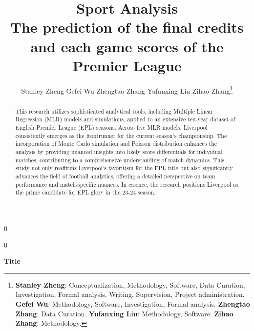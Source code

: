 \documentclass[12pt]{article}
\newcommand{\blind}{0}
\begin{document}

%

\def\spacingset#1{\renewcommand{\baselinestretch}%
{#1}\small\normalsize} \spacingset{1}




\blind
{
  \title{\bf{Sport Analysis} \\ \small{The prediction of the final credits and each game scores of the Premier League} }
  \author{Stanley Zheng \quad Gefei Wu \quad Zhengtao Zhang \quad Yufanxing Liu \quad Zihao Zhang\footnote{\textbf{Stanley Zheng}: Conceptualization, Methodology, Software, Data Curation, Investigation, Formal analysis, Writing, Supervision, Project administration. \textbf{Gefei Wu}: Methodology, Software, Investigation, Formal analysis. \textbf{Zhengtao Zhang}: Data Curation. \textbf{Yufanxing Liu}: Methodology, Software. \textbf{Zihao Zhang}: Methodology.}}
  \maketitle
} \fi

\blind
{
  \bigskip
  \bigskip
  \bigskip
  \begin{center}
    {\LARGE\bf Title}
\end{center}
  \medskip
} \fi

\bigskip
\begin{abstract}
This research utilizes sophisticated analytical tools, including Multiple Linear Regression (MLR) models and simulations, applied to an extensive ten-year dataset of English Premier League (EPL) seasons. Across five MLR models, Liverpool consistently emerges as the frontrunner for the current season's championship. The incorporation of Monte Carlo simulation and Poisson distribution enhances the analysis by providing nuanced insights into likely score differentials for individual matches, contributing to a comprehensive understanding of match dynamics. This study not only reaffirms Liverpool's favoritism for the EPL title but also significantly advances the field of football analytics, offering a detailed perspective on team performance and match-specific nuances. In essence, the research positions Liverpool as the prime candidate for EPL glory in the 23-24 season.
\end{abstract}


\spacingset{1.45}
\end{document}
